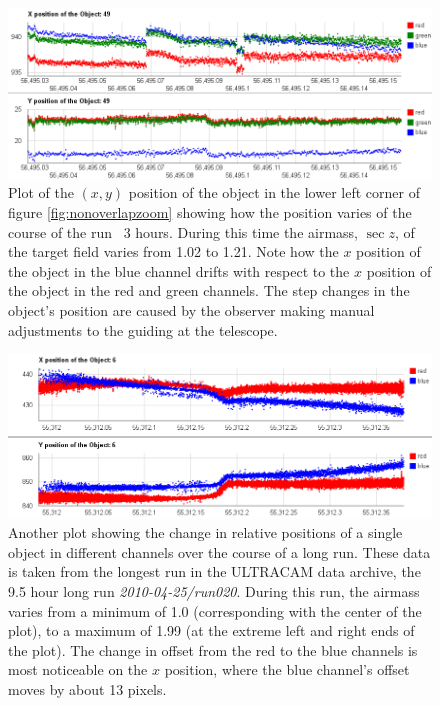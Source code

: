 \begin{figure}
  \centering
  \includegraphics[width=140mm]{images/position_drift.png}
  \caption{Plot of the $(x, y)$ position of the object in the lower left corner of figure \ref{fig:nonoverlapzoom} showing how the position varies of the course of the run ~3 hours. During this time the airmass, $\sec z$, of the target field varies from 1.02 to 1.21. Note how the $x$ position of the object in the blue channel drifts with respect to the $x$ position of the object in the red and green channels. The step changes in the object's position are caused by the observer making manual adjustments to the guiding at the telescope. }
\label{fig:positiondrift}
\end{figure}

\begin{figure}
  \centering
  \includegraphics[width=140mm]{images/position_drift_longrun.png}
   \caption{Another plot showing the change in relative positions of a single object in different channels over the course of a long run. These data is taken from the longest run in the ULTRACAM data archive, the 9.5 hour long run \emph{2010-04-25/run020}. During this run, the airmass varies from a minimum of 1.0 (corresponding with the center of the plot), to a maximum of 1.99 (at the extreme left and right ends of the plot). The change in offset from the red to the blue channels is most noticeable on the $x$ position, where the blue channel's offset moves by about 13 pixels. }
\label{fig:positiondriftlongrun}
\end{figure}

